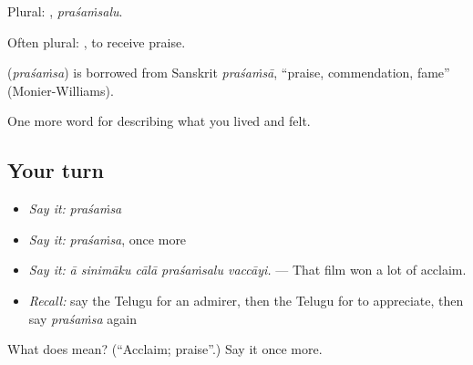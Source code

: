 Plural: , \emph{praśaṁsalu}.

Often plural:  , to receive praise.

\begin{cousinweb}
\textbf{} (\emph{praśaṁsa}) is borrowed from Sanskrit \emph{praśaṁsā}, \textquotedblleft{}praise, commendation, fame\textquotedblright{} (Monier-Williams).
\end{cousinweb}

\begin{grammarlens}[title={What you've built}]
One more word for describing what you lived and felt.
\end{grammarlens}

\subsection*{Your turn}
\begin{itemize}
\raggedright
  \item \emph{Say it:} \emph{praśaṁsa}
  \item \emph{Say it:} \emph{praśaṁsa}, once more
  \item \emph{Say it:} \emph{ā sinimāku cālā praśaṁsalu vaccāyi.} — That film won a lot of acclaim.
  \item \emph{Recall:} say the Telugu for an admirer, then the Telugu for to appreciate, then say \emph{praśaṁsa} again
\end{itemize}

\begin{tcolorbox}[breakable,colback=teal!4,colframe=teal!35!black,title={Before you move on}]
What does  mean? (\textquotedblleft{}Acclaim; praise\textquotedblright{}.) Say it once more.
\end{tcolorbox}
